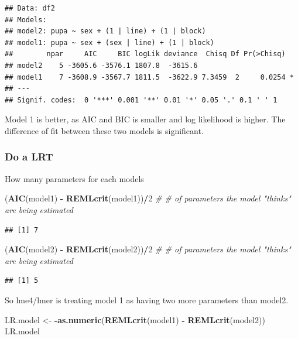 \documentclass[
]{article}
\newenvironment{Shaded}{\begin{snugshade}}{\end{snugshade}}
\newcommand{\CommentTok}[1]{\textcolor[rgb]{0.56,0.35,0.01}{\textit{#1}}}
\newcommand{\DecValTok}[1]{\textcolor[rgb]{0.00,0.00,0.81}{#1}}
\newcommand{\KeywordTok}[1]{\textcolor[rgb]{0.13,0.29,0.53}{\textbf{#1}}}
\newcommand{\NormalTok}[1]{#1}
\newcommand{\OperatorTok}[1]{\textcolor[rgb]{0.81,0.36,0.00}{\textbf{#1}}}
\newcommand{\StringTok}[1]{\textcolor[rgb]{0.31,0.60,0.02}{#1}}
\begin{document}
\begin{verbatim}
## Data: df2
## Models:
## model2: pupa ~ sex + (1 | line) + (1 | block)
## model1: pupa ~ sex + (sex | line) + (1 | block)
##        npar     AIC     BIC logLik deviance  Chisq Df Pr(>Chisq)  
## model2    5 -3605.6 -3576.1 1807.8  -3615.6                       
## model1    7 -3608.9 -3567.7 1811.5  -3622.9 7.3459  2     0.0254 *
## ---
## Signif. codes:  0 '***' 0.001 '**' 0.01 '*' 0.05 '.' 0.1 ' ' 1
\end{verbatim}

Model 1 is better, as AIC and BIC is smaller and log likelihood is
higher. The difference of fit between these two models is significant.

\hypertarget{do-a-lrt-2}{%
\subsubsection{Do a LRT}\label{do-a-lrt-2}}

How many parameters for each models

\begin{Shaded}
\begin{Highlighting}[]
\NormalTok{(}\KeywordTok{AIC}\NormalTok{(model1) }\OperatorTok{-}\StringTok{ }\KeywordTok{REMLcrit}\NormalTok{(model1))}\OperatorTok{/}\DecValTok{2} \CommentTok{# # of parameters the model "thinks" are being estimated}
\end{Highlighting}
\end{Shaded}

\begin{verbatim}
## [1] 7
\end{verbatim}

\begin{Shaded}
\begin{Highlighting}[]
\NormalTok{(}\KeywordTok{AIC}\NormalTok{(model2) }\OperatorTok{-}\StringTok{ }\KeywordTok{REMLcrit}\NormalTok{(model2))}\OperatorTok{/}\DecValTok{2} \CommentTok{# # of parameters the model "thinks" are being estimated}
\end{Highlighting}
\end{Shaded}

\begin{verbatim}
## [1] 5
\end{verbatim}

So lme4/lmer is treating model 1 as having two more parameters than
model2.

\begin{Shaded}
\begin{Highlighting}[]
\NormalTok{LR.model <-}\StringTok{  }\OperatorTok{-}\KeywordTok{as.numeric}\NormalTok{(}\KeywordTok{REMLcrit}\NormalTok{(model1) }\OperatorTok{-}\StringTok{ }\KeywordTok{REMLcrit}\NormalTok{(model2))}
\NormalTok{LR.model}
\end{Highlighting}
\end{Shaded}
\end{document}
